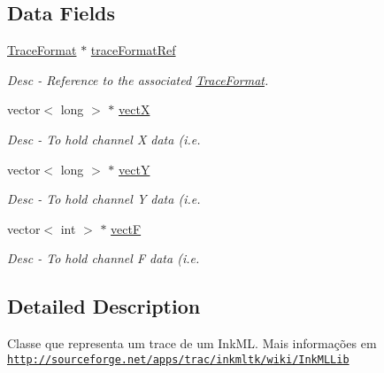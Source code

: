 \subsection*{Data Fields}
\begin{DoxyCompactItemize}
\item 
\hyperlink{classbr_1_1ufscar_1_1lince_1_1mmi_1_1ink_1_1TraceFormat}{TraceFormat} $\ast$ \hyperlink{classbr_1_1ufscar_1_1lince_1_1mmi_1_1ink_1_1Trace_a87c33c99c915d0ae5808adf580554c42}{traceFormatRef}
\begin{DoxyCompactList}\small\item\em Desc -\/ Reference to the associated \hyperlink{classbr_1_1ufscar_1_1lince_1_1mmi_1_1ink_1_1TraceFormat}{TraceFormat}. \item\end{DoxyCompactList}\item 
vector$<$ long $>$ $\ast$ \hyperlink{classbr_1_1ufscar_1_1lince_1_1mmi_1_1ink_1_1Trace_a9a8d9f9bbffdd49af980bdd7c80ee4ae}{vectX}
\begin{DoxyCompactList}\small\item\em Desc -\/ To hold channel X data (i.e. \item\end{DoxyCompactList}\item 
vector$<$ long $>$ $\ast$ \hyperlink{classbr_1_1ufscar_1_1lince_1_1mmi_1_1ink_1_1Trace_a6914065da435b344151f55f6d60a7fdd}{vectY}
\begin{DoxyCompactList}\small\item\em Desc -\/ To hold channel Y data (i.e. \item\end{DoxyCompactList}\item 
vector$<$ int $>$ $\ast$ \hyperlink{classbr_1_1ufscar_1_1lince_1_1mmi_1_1ink_1_1Trace_ab73af23278fce63da5defb36a2bc5cea}{vectF}
\begin{DoxyCompactList}\small\item\em Desc -\/ To hold channel F data (i.e. \item\end{DoxyCompactList}\end{DoxyCompactItemize}


\subsection{Detailed Description}
Classe que representa um trace de um InkML. Mais informações em \href{http://sourceforge.net/apps/trac/inkmltk/wiki/InkMLLib}{\tt http://sourceforge.net/apps/trac/inkmltk/wiki/InkMLLib} 

